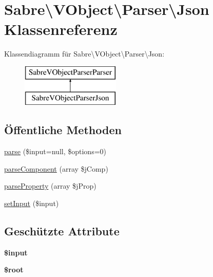 \hypertarget{class_sabre_1_1_v_object_1_1_parser_1_1_json}{}\section{Sabre\textbackslash{}V\+Object\textbackslash{}Parser\textbackslash{}Json Klassenreferenz}
\label{class_sabre_1_1_v_object_1_1_parser_1_1_json}
Klassendiagramm für Sabre\textbackslash{}V\+Object\textbackslash{}Parser\textbackslash{}Json\+:\begin{figure}[H]
\begin{center}
\leavevmode
\includegraphics[height=2.000000cm]{class_sabre_1_1_v_object_1_1_parser_1_1_json}
\end{center}
\end{figure}
\subsection*{Öffentliche Methoden}
\begin{DoxyCompactItemize}
\item 
\mbox{\hyperlink{class_sabre_1_1_v_object_1_1_parser_1_1_json_a46c0e88efac1ef03c8bad23b24eda9db}{parse}} (\$input=null, \$options=0)
\item 
\mbox{\hyperlink{class_sabre_1_1_v_object_1_1_parser_1_1_json_afe8fc3bc15a0561bb1c03be5c8b99c65}{parse\+Component}} (array \$j\+Comp)
\item 
\mbox{\hyperlink{class_sabre_1_1_v_object_1_1_parser_1_1_json_afe2d0c3c671c22b279b9f7d52b810028}{parse\+Property}} (array \$j\+Prop)
\item 
\mbox{\hyperlink{class_sabre_1_1_v_object_1_1_parser_1_1_json_a03348ab9610fe5ac4f820c87430f71a5}{set\+Input}} (\$input)
\end{DoxyCompactItemize}
\subsection*{Geschützte Attribute}
\begin{DoxyCompactItemize}
\item 
\mbox{\label{class_sabre_1_1_v_object_1_1_parser_1_1_json_a28f4293f85a543a9171aadffe226158c}} 
{\bfseries \$input}
\item 
\mbox{\label{class_sabre_1_1_v_object_1_1_parser_1_1_json_ae2db85e37432ee8c7738f97ddd78fb6a}} 
{\bfseries \$root}
\end{DoxyCompactItemize}
